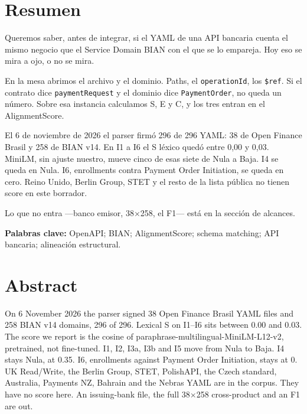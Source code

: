 \listoffigures
{}

\chapter*{Resumen}


Queremos saber, antes de integrar, si el YAML de una API bancaria cuenta el mismo negocio que el Service Domain BIAN con el que se lo empareja. Hoy eso se mira a ojo, o no se mira.

En la mesa abrimos el archivo y el dominio. Paths, el \texttt{operationId}, los \texttt{\$ref}. Si el contrato dice \texttt{paymentRequest} y el dominio dice \texttt{PaymentOrder}, no queda un número. Sobre esa instancia calculamos S, E y C, y los tres entran en el AlignmentScore.

El 6 de noviembre de 2026 el parser firmó 296 de 296 YAML: 38 de Open Finance Brasil y 258 de BIAN v14. En I1 a I6 el S léxico quedó entre 0,00 y 0,03. MiniLM, sin ajuste nuestro, mueve cinco de esas siete de Nula a Baja. I4 se queda en Nula. I6, enrollments contra Payment Order Initiation, se queda en cero. Reino Unido, Berlin Group, STET y el resto de la lista pública no tienen score en este borrador.

Lo que no entra ---banco emisor, 38$\times$258, el F1--- está en la sección de alcances.

\vspace{0.4cm}
\noindent\textbf{Palabras clave:} OpenAPI; BIAN; AlignmentScore; schema matching; API bancaria; alineación estructural.

\chapter*{Abstract}


On 6 November 2026 the parser signed 38 Open Finance Brasil YAML files and 258 BIAN v14 domains, 296 of 296. Lexical S on I1--I6 sits between 0.00 and 0.03. The score we report is the cosine of paraphrase-multilingual-MiniLM-L12-v2, pretrained, not fine-tuned. I1, I2, I3a, I3b and I5 move from Nula to Baja. I4 stays Nula, at 0.35. I6, enrollments against Payment Order Initiation, stays at 0. UK Read/Write, the Berlin Group, STET, PolishAPI, the Czech standard, Australia, Payments NZ, Bahrain and the Nebras YAML are in the corpus. They have no score here. An issuing-bank file, the full 38$\times$258 cross-product and an F1 are out.

